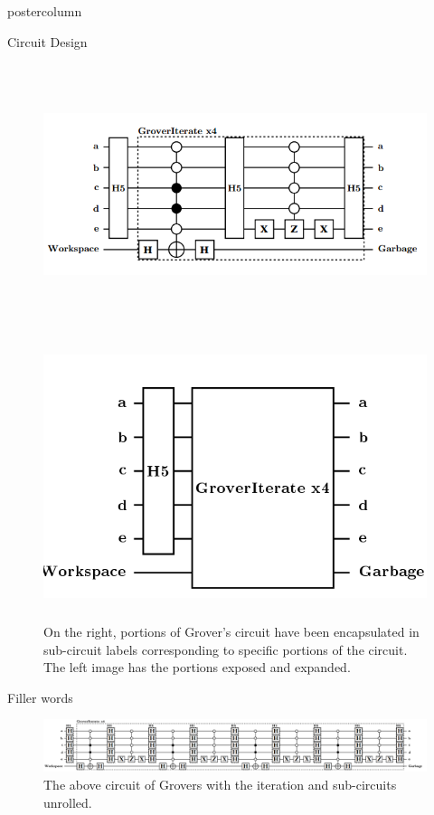 \documentclass[final]{beamer} %
\begin{document}
\begin{frame}{}
\begin{columns}
\begin{column}{.33\textwidth}
\begin{beamercolorbox}[center,wd=\textwidth]{postercolumn}
\begin{minipage}[T]{.95\textwidth}
\begin{block}{\large Circuit Design}
             \centering 
		\begin{figure}[!htbp]
		  \centering
		  \includegraphics[height=3in]{figures/Grover_Loop.png} \ \ \ \ \includegraphics[height=3in]{figures/Grover_Roll.png} 
		  \caption{On the right, portions of Grover's circuit have been encapsulated in sub-circuit labels corresponding to specific portions of the circuit. The left image has the portions exposed and expanded.}
		\end{figure}

	    Filler words

             \centering 
		\begin{figure}[!htbp]
		  \centering
		  \includegraphics[width=14in]{figures/Grover_Unroll.png}
		  \caption{The above circuit of Grovers with the iteration and sub-circuits unrolled.}
		\end{figure}


\end{block}
\end{minipage}
\end{beamercolorbox}
\end{column}
\end{columns}
\end{frame}
\end{document}
